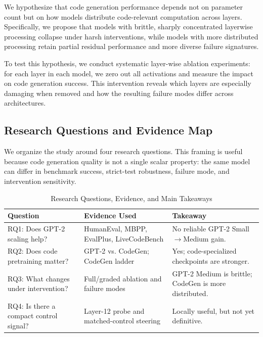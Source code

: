 \documentclass[preprint,12pt,authoryear]{elsarticle}
\begin{document}
We hypothesize that code generation performance depends not on parameter count but on how models distribute code-relevant computation across layers. Specifically, we propose that models with brittle, sharply concentrated layerwise processing collapse under harsh interventions, while models with more distributed processing retain partial residual performance and more diverse failure signatures.

To test this hypothesis, we conduct systematic layer-wise ablation experiments: for each layer in each model, we zero out all activations and measure the impact on code generation success. This intervention reveals which layers are especially damaging when removed and how the resulting failure modes differ across architectures.

\subsection{Research Questions and Evidence Map}

We organize the study around four research questions. This framing is useful because code generation quality is not a single scalar property: the same model can differ in benchmark success, strict-test robustness, failure mode, and intervention sensitivity.

\begin{table}[H]
\centering
\caption{Research Questions, Evidence, and Main Takeaways}
\label{tab:rq_map}
\scriptsize
\begin{tabularx}{\columnwidth}{@{}>{\raggedright\arraybackslash}p{}>{\raggedright\arraybackslash}X>{\raggedright\arraybackslash}p{}@{}}
\toprule
\textbf{Question} & \textbf{Evidence Used} & \textbf{Takeaway} \\
\midrule
RQ1: Does GPT-2 scaling help? & HumanEval, MBPP, EvalPlus, LiveCodeBench & No reliable GPT-2 Small$\rightarrow$Medium gain. \\
RQ2: Does code pretraining matter? & GPT-2 vs. CodeGen; CodeGen ladder & Yes; code-specialized checkpoints are stronger. \\
RQ3: What changes under intervention? & Full/graded ablation and failure modes & GPT-2 Medium is brittle; CodeGen is more distributed. \\
RQ4: Is there a compact control signal? & Layer-12 probe and matched-control steering & Locally useful, but not yet definitive. \\
\bottomrule
\end{tabularx}
\end{table}
\end{document}
